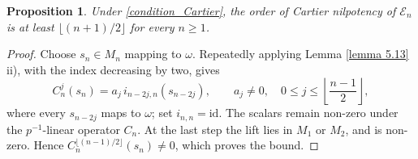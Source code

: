 \documentclass[12pt,a4]{amsart}
\newtheorem{prop}[claim]{Proposition}
\theoremstyle{definition}
\begin{document}
\begin{prop}\label{Prop_Cartier_nilpotency}
Under \eqref{condition_Cartier}, the order of Cartier nilpotency of
$\mathcal E_n$ is at least $\lfloor(n+1)/2\rfloor$ for every $n\geq1$.
\end{prop}
\begin{proof}
Choose $s_n\in M_n$ mapping to $\omega$. Repeatedly applying
Lemma \ref{lemma 5.13} ii), with the index decreasing by two, gives
\[
C_n^j(s_n)=a_j\,i_{n-2j,n}(s_{n-2j}),\qquad a_j\ne0,
\quad 0\leq j\leq\left\lfloor\frac{n-1}{2}\right\rfloor,
\]
where every $s_{n-2j}$ maps to $\omega$; set $i_{n,n}=\mathrm{id}$.
The scalars remain non-zero under the $p^{-1}$-linear operator $C_n$.
At the last step the lift lies in $M_1$ or $M_2$, and is non-zero.
Hence $C_n^{\lfloor(n-1)/2\rfloor}(s_n)\ne0$, which proves the bound.
\end{proof}
\end{document}
